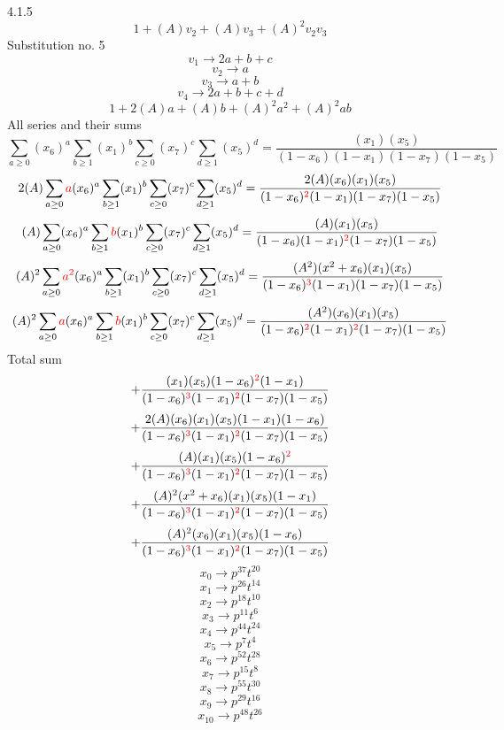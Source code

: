 \documentclass{article}
\begin{document}
4.1.5
\[1+(A)v_2+(A)v_3+(A)^2v_2v_3\]Substitution no. 5\[v_1\rightarrow{2a+b+c}\]\[v_2\rightarrow{a}\]\[v_3\rightarrow{a+b}\]\[v_4\rightarrow{2a+b+c+d}\]\[1+2(A)a+(A)b+(A)^2a^{2}+(A)^2ab\]All series and their sums\[\sum_{a\geq{0}}(x_6)^{a}\sum_{b\geq{1}}(x_1)^{b}\sum_{c\geq{0}}(x_7)^{c}\sum_{d\geq{1}}(x_5)^{d}=\frac{(x_1)(x_5)}{(1-x_6)(1-x_1)(1-x_7)(1-x_5)}\]\[2(A)\sum_{a\geq{0}}\textcolor{red}{a}(x_6)^{a}\sum_{b\geq{1}}(x_1)^{b}\sum_{c\geq{0}}(x_7)^{c}\sum_{d\geq{1}}(x_5)^{d}=\frac{2(A)(x_6)(x_1)(x_5)}{(1-x_6)^{\textcolor{red}{2}}(1-x_1)(1-x_7)(1-x_5)}\]\[(A)\sum_{a\geq{0}}(x_6)^{a}\sum_{b\geq{1}}\textcolor{red}{b}(x_1)^{b}\sum_{c\geq{0}}(x_7)^{c}\sum_{d\geq{1}}(x_5)^{d}=\frac{(A)(x_1)(x_5)}{(1-x_6)(1-x_1)^{\textcolor{red}{2}}(1-x_7)(1-x_5)}\]\[(A)^{2}\sum_{a\geq{0}}\textcolor{red}{a^{2}}(x_6)^{a}\sum_{b\geq{1}}(x_1)^{b}\sum_{c\geq{0}}(x_7)^{c}\sum_{d\geq{1}}(x_5)^{d}=\frac{(A^{2})(x^{2}+x_6)(x_1)(x_5)}{(1-x_6)^{\textcolor{red}{3}}(1-x_1)(1-x_7)(1-x_5)}\]\[(A)^{2}\sum_{a\geq{0}}\textcolor{red}{a}(x_6)^{a}\sum_{b\geq{1}}\textcolor{red}{b}(x_1)^{b}\sum_{c\geq{0}}(x_7)^{c}\sum_{d\geq{1}}(x_5)^{d}=\frac{(A^{2})(x_6)(x_1)(x_5)}{(1-x_6)^{\textcolor{red}{2}}(1-x_1)^{\textcolor{red}{2}}(1-x_7)(1-x_5)}\]
Total sum
\[+\frac{(x_1)(x_5)(1-x_6)^{\textcolor{red}{2}}(1-x_1)}{(1-x_6)^{\textcolor{red}{3}}(1-x_1)^{\textcolor{red}{2}}(1-x_7)(1-x_5)}\]\[+\frac{2(A)(x_6)(x_1)(x_5)(1-x_1)(1-x_6)}{(1-x_6)^{\textcolor{red}{3}}(1-x_1)^{\textcolor{red}{2}}(1-x_7)(1-x_5)}\]\[+\frac{(A)(x_1)(x_5)(1-x_6)^{\textcolor{red}{2}}}{(1-x_6)^{\textcolor{red}{3}}(1-x_1)^{\textcolor{red}{2}}(1-x_7)(1-x_5)}\]\[+\frac{(A)^{2}(x^{2}+x_6)(x_1)(x_5)(1-x_1)}{(1-x_6)^{\textcolor{red}{3}}(1-x_1)^{\textcolor{red}{2}}(1-x_7)(1-x_5)}\]\[+\frac{(A)^{2}(x_6)(x_1)(x_5)(1-x_6)}{(1-x_6)^{\textcolor{red}{3}}(1-x_1)^{\textcolor{red}{2}}(1-x_7)(1-x_5)}\]\[x_0\rightarrow{p^{37}t^{20}}\]\[x_1\rightarrow{p^{26}t^{14}}\]\[x_2\rightarrow{p^{18}t^{10}}\]\[x_3\rightarrow{p^{11}t^{6}}\]\[x_4\rightarrow{p^{44}t^{24}}\]\[x_5\rightarrow{p^{7}t^{4}}\]\[x_6\rightarrow{p^{52}t^{28}}\]\[x_7\rightarrow{p^{15}t^{8}}\]\[x_8\rightarrow{p^{55}t^{30}}\]\[x_9\rightarrow{p^{29}t^{16}}\]\[x_10\rightarrow{p^{48}t^{26}}\]
\end{document}
